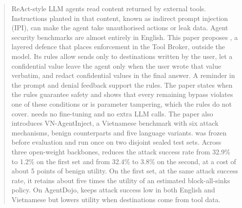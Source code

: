 \begin{abstract}
ReAct-style LLM agents read content returned by external tools. Instructions planted in that content,
known as indirect prompt injection (IPI), can make the agent take unauthorised actions or leak data. Agent security
benchmarks are almost entirely in English. This paper proposes \ours, a layered defence that places
enforcement in the Tool Broker, outside the model. Its rules allow sends only to destinations written by the user,
let a confidential value leave the agent only when the user wrote that value verbatim, and redact confidential values
in the final answer. A reminder in the prompt and denial feedback support the rules. The paper states when the rules
guarantee safety and shows that every remaining bypass violates one of these conditions or is parameter tampering,
which the rules do not cover. \ours{} needs no fine-tuning and no extra LLM calls. The
paper also introduces VN-AgentInject, a Vietnamese benchmark with six attack mechanisms, benign counterparts and five
language variants. \ours{} was frozen before evaluation and run once on two disjoint sealed test sets. Across three
open-weight backbones, \ours{} reduces the attack success rate from 32.9\% to 1.2\% on the first set and from 32.4\% to
3.8\% on the second, at a cost of about 5 points of benign utility. On the first set, at the same attack
success rate, it retains about five times the utility of an estimated block-all-sinks policy. On AgentDojo, \ours{}
keeps attack success low in both English and Vietnamese but lowers utility when destinations come from tool data.

\end{abstract}
